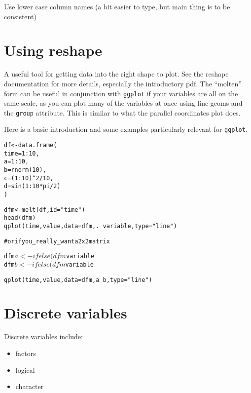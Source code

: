 Use lower case column names (a bit easier to type, but main thing is to be consistent)

\section{Using reshape}\label{sec:using_reshape}

A useful tool for getting data into the right shape to plot.  See the reshape documentation for more details, especially the introductory pdf.  The ``molten'' form can be useful in conjunction with {\tt ggplot} if your variables are all on the same scale, as you can plot many of the variables at once using line geoms and the {\tt group} attribute.  This is similar to what the parallel coordinates plot does.

Here is a basic introduction and some examples particularly relevant for {\tt ggplot}.


\begin{alltt}
df <- data.frame(
  time = 1:10, 
  a    = 1:10, 
  b    = rnorm(10), 
  c    = (1:10)^2 / 10, 
  d    = sin(1:10 * pi/2)
)

dfm <- melt(df, id="time")
head(dfm)
qplot(time, value, data=dfm, . ~ variable, type="line")

# or if you _really_ want a 2x2 matrix

dfm$a <- ifelse(dfm$variable %in% c("a","b"), 1, 2)
dfm$b <- ifelse(dfm$variable %in% c("a","c"), 1, 2)

qplot(time, value, data=dfm, a ~ b, type="line")
\end{alltt}

\section{Discrete variables}
\label{sec:vartypes}

Discrete variables include:

\begin{itemize}
  \item factors
  \item logical
  \item character
\end{itemize}



